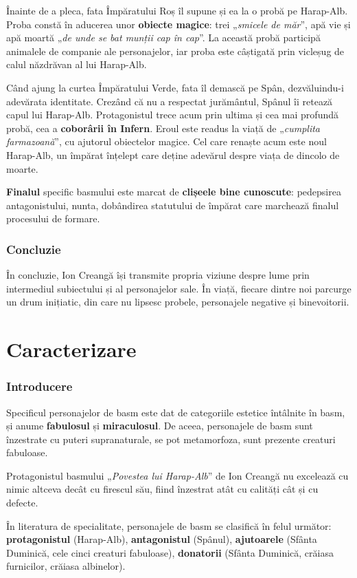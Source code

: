 \documentclass{article}
\newcommand{\qu}[1]{„\emph{#1}”}
\begin{document}
Înainte de a pleca, fata Împăratului Roș îl supune și ea la o probă pe Harap-Alb. Proba constă în aducerea unor \textbf{obiecte magice}: trei \qu{smicele de măr}, apă vie și apă moartă \qu{de unde se bat munții cap în cap}. La această probă participă animalele de companie ale personajelor, iar proba este câștigată prin vicleșug de calul năzdrăvan al lui Harap-Alb.

Când ajung la curtea Împăratului Verde, fata îl demască pe Spân, dezvăluindu-i adevărata identitate. Crezând că nu a respectat jurământul, Spânul îi retează capul lui Harap-Alb. Protagonistul trece acum prin ultima și cea mai profundă probă, cea a \textbf{coborârii în Infern}. Eroul este readus la viață de \qu{cumplita farmazoană}, cu ajutorul obiectelor magice. Cel care renaște acum este noul Harap-Alb, un împărat înțelept care deține adevărul despre viața de dincolo de moarte.

\textbf{Finalul} specific basmului este marcat de \textbf{clișeele bine cunoscute}: pedepsirea antagonistului, nunta, dobândirea statutului de împărat care marchează finalul procesului de formare.
\section{Concluzie}
În concluzie, Ion Creangă își transmite propria viziune despre lume prin intermediul subiectului și al personajelor sale. În viață, fiecare dintre noi parcurge un drum inițiatic, din care nu lipsesc probele, personajele negative și binevoitorii.
\part*{Caracterizare}
\setcounter{section}{0}
\section{Introducere}
Specificul personajelor de basm este dat de categoriile estetice întâlnite în basm, și anume \textbf{fabulosul} și \textbf{miraculosul}. De aceea, personajele de basm sunt înzestrate cu puteri supranaturale, se pot metamorfoza, sunt prezente creaturi fabuloase. 

Protagonistul basmului \qu{Povestea lui Harap-Alb} de Ion Creangă nu excelează cu nimic altceva decât cu firescul său, fiind înzestrat atât cu calități cât și cu defecte.

În literatura de specialitate, personajele de basm se clasifică în felul următor: \textbf{protagonistul} (Harap-Alb), \textbf{antagonistul} (Spânul), \textbf{ajutoarele} (Sfânta Duminică, cele cinci creaturi fabuloase), \textbf{donatorii} (Sfânta Duminică, crăiasa furnicilor, crăiasa albinelor).
\end{document}
